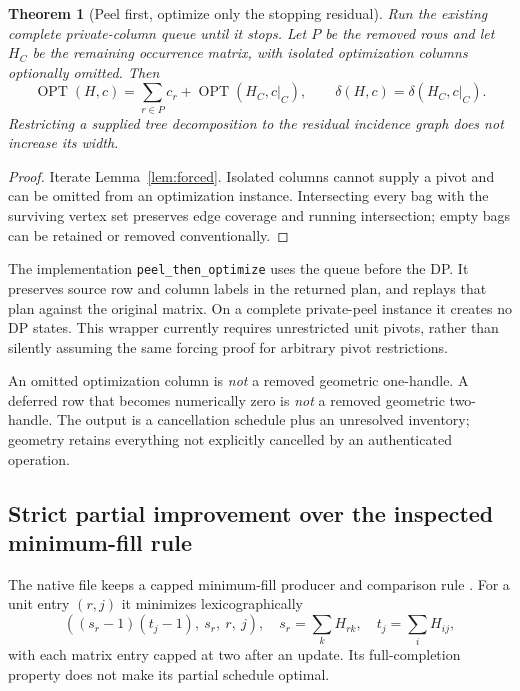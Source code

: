 \documentclass[11pt,a4paper]{article}
\newtheorem{theorem}{Theorem}[section]
\theoremstyle{definition}
\theoremstyle{remark}
\newcommand{\OPT}{\operatorname{OPT}}
\newcommand{\code}[1]{\nolinkurl{#1}}
\begin{document}
\begin{theorem}[Peel first, optimize only the stopping residual]
\label{thm:prepass}
Run the existing complete private-column queue until it stops. Let $P$ be
the removed rows and let $H_C$ be the remaining occurrence matrix, with
isolated optimization columns optionally omitted. Then
\[
 \OPT(H,c)=\sum_{r\in P}c_r+\OPT(H_C,c|_C),
 \qquad \delta(H,c)=\delta(H_C,c|_C).
\]
Restricting a supplied tree decomposition to the residual incidence graph
does not increase its width.
\end{theorem}
\begin{proof}
Iterate Lemma~\ref{lem:forced}. Isolated columns cannot supply a pivot and
can be omitted from an optimization instance. Intersecting every bag with
the surviving vertex set preserves edge coverage and running intersection;
empty bags can be retained or removed conventionally.
\end{proof}

The implementation \code{peel_then_optimize} uses the queue before the DP.
It preserves source row and column labels in the returned plan, and
replays that plan against the original matrix. On a complete private-peel
instance it creates no DP states. This wrapper currently requires
unrestricted unit pivots, rather than silently assuming the same forcing
proof for arbitrary pivot restrictions.

An omitted optimization column is \emph{not} a removed geometric
one-handle. A deferred row that becomes numerically zero is \emph{not}
a removed geometric two-handle. The output is a cancellation schedule plus
an unresolved inventory; geometry retains everything not explicitly
cancelled by an authenticated operation.


\subsection{Strict partial improvement over the inspected minimum-fill rule}
\label{sec:minfill}
The native file keeps a capped minimum-fill producer and comparison rule
\cite{repo-core}. For a unit entry $(r,j)$ it minimizes lexicographically
\[
 ((s_r-1)(t_j-1),\ s_r,\ r,\ j),
 \quad s_r=\sum_k H_{rk},\quad t_j=\sum_i H_{ij},
\]
with each matrix entry capped at two after an update. Its full-completion
property does not make its partial schedule optimal.
\end{document}
